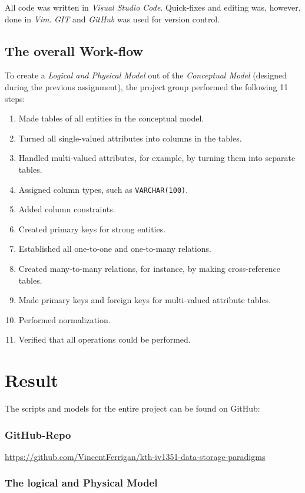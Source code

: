 \documentclass[a4paper]{scrartcl}
\begin{document}
All code was written in \emph{Visual Studio Code}.
Quick-fixes and editing was, however, done in \emph{Vim}. 
\emph{GIT} and \emph{GitHub} was used for version control.

\subsection*{The overall Work-flow}
To create a \emph{Logical and Physical Model} out of the
\emph{Conceptual Model} (designed during the previous assignment),
the project group performed the following 11 steps:
\begin{enumerate}
  \item Made tables of all entities in the conceptual model.
  \item Turned all single-valued attributes into columns in the tables.
  \item Handled multi-valued attributes, for example, by turning them into separate tables.
  \item Assigned column types, such as \texttt{VARCHAR(100)}.
  \item Added column constraints.
  \item Created primary keys for strong entities.
  \item Established all one-to-one and one-to-many relations.
  \item Created many-to-many relations, for instance, by making cross-reference tables.
  \item Made primary keys and foreign keys for multi-valued attribute tables.
  \item Performed normalization.
  \item Verified that all operations could be performed.
\end{enumerate}

\pagebreak
\section{Result}
The scripts and models for the entire project can be found on GitHub:

\subsubsection*{GitHub-Repo}
\url{https://github.com/VincentFerrigan/kth-iv1351-data-storage-paradigms}

\subsubsection*{The logical and Physical Model}
\end{document}
